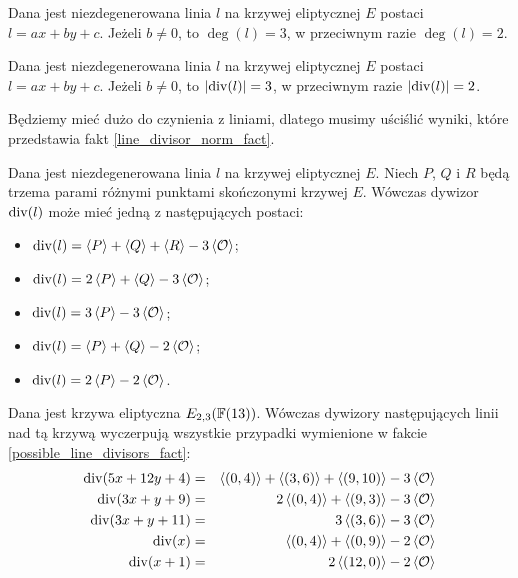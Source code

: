 \begin{fact}\label{line_deg_fact}
Dana jest niezdegenerowana linia $l$ na krzywej eliptycznej $E$
postaci $l = ax + by + c$.
Jeżeli $b \neq 0$, to $\deg(l) = 3$,
w przeciwnym razie $\deg(l) = 2$.
\end{fact}

\begin{fact}\label{line_divisor_norm_fact}
Dana jest niezdegenerowana linia $l$ na krzywej eliptycznej $E$
postaci $l = ax + by + c$.
Jeżeli $b \neq 0$, to $\lvert\operatorname{div}(l)\rvert = 3$,
w przeciwnym razie $\lvert\operatorname{div}(l)\rvert = 2$.
\end{fact}

\noindent
Będziemy mieć dużo do czynienia z liniami,
dlatego musimy uściślić wyniki,
które przedstawia fakt \ref{line_divisor_norm_fact}.

\begin{fact}\label{possible_line_divisors_fact}
Dana jest niezdegenerowana linia $l$ na krzywej eliptycznej $E$.
Niech $P$, $Q$ i $R$ będą
trzema parami różnymi punktami skończonymi krzywej $E$.
Wówczas dywizor $\operatorname{div}(l)$ może mieć jedną z następujących postaci:
\begin{itemize}
\item $\operatorname{div}(l) = \left\langle P\right\rangle + \left\langle Q\right\rangle + \left\langle R\right\rangle - 3\left\langle\mathcal{O}\right\rangle$;
\item $\operatorname{div}(l) = 2\left\langle P\right\rangle + \left\langle Q\right\rangle - 3\left\langle\mathcal{O}\right\rangle$;
\item $\operatorname{div}(l) = 3\left\langle P\right\rangle - 3\left\langle\mathcal{O}\right\rangle$;
\item $\operatorname{div}(l) = \left\langle P\right\rangle + \left\langle Q\right\rangle - 2\left\langle\mathcal{O}\right\rangle$;
\item $\operatorname{div}(l) = 2\left\langle P\right\rangle - 2\left\langle\mathcal{O}\right\rangle$.
\end{itemize}
\end{fact}

\begin{example}
Dana jest krzywa eliptyczna $E_{2,3}(\mathbb{F}(13))$.
Wówczas dywizory następujących linii nad tą krzywą
wyczerpują wszystkie przypadki wymienione w fakcie
\ref{possible_line_divisors_fact}:
\begin{eqnarray*}
\operatorname{div}(5x + 12y + 4)
& = &
\left\langle(0, 4)\right\rangle + \left\langle(3, 6)\right\rangle + \left\langle(9, 10)\right\rangle - 3\left\langle\mathcal{O}\right\rangle
\\
\operatorname{div}(3x + y + 9)
& = &
2\left\langle(0, 4)\right\rangle + \left\langle(9, 3)\right\rangle - 3\left\langle\mathcal{O}\right\rangle
\\
\operatorname{div}(3x + y + 11)
& = &
3\left\langle(3, 6)\right\rangle - 3\left\langle\mathcal{O}\right\rangle
\\
\operatorname{div}(x)
& = &
\left\langle(0, 4)\right\rangle + \left\langle(0, 9)\right\rangle - 2\left\langle\mathcal{O}\right\rangle
\\
\operatorname{div}(x + 1)
& = &
2\left\langle(12, 0)\right\rangle - 2\left\langle\mathcal{O}\right\rangle
\end{eqnarray*}
\end{example}

